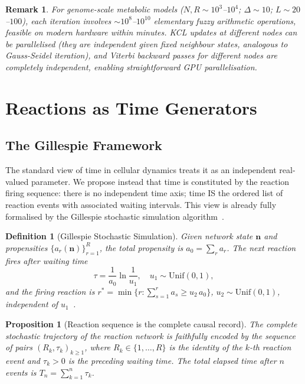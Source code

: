 \documentclass[twocolumn,10pt,a4paper]{article}
\newtheorem{proposition}[theorem]{Proposition}
\newtheorem{definition}[theorem]{Definition}
\newtheorem{remark}[theorem]{Remark}
\begin{document}
\begin{remark}
For genome-scale metabolic models ($N,R\sim 10^3$--$10^4$; $\Delta\sim 10$;
$L\sim 20$--$100$), each iteration involves $\sim 10^8$--$10^{10}$ elementary
fuzzy arithmetic operations, feasible on modern hardware within minutes.  KCL
updates at different nodes can be parallelised (they are independent given
fixed neighbour states, analogous to Gauss-Seidel iteration), and Viterbi
backward passes for different nodes are completely independent, enabling
straightforward GPU parallelisation.
\end{remark}

\section{Reactions as Time Generators}
\label{sec:time}

\subsection{The Gillespie Framework}
\label{sec:time-gillespie}

The standard view of time in cellular dynamics treats it as an independent
real-valued parameter.  We propose instead that time is constituted by the
reaction firing sequence: there is no independent time axis; time IS the
ordered list of reaction events with associated waiting intervals.  This view
is already fully formalised by the Gillespie stochastic simulation
algorithm~\cite{Gillespie1977,Gillespie1976}.

\begin{definition}[Gillespie Stochastic Simulation]
\label{def:gillespie}
Given network state $\mathbf{n}$ and propensities $\{a_r(\mathbf{n})\}_{r=1}^R$,
the total propensity is $a_0=\sum_r a_r$.  The next reaction fires after
waiting time
\begin{equation}
  \tau = \frac{1}{a_0}\ln\frac{1}{u_1},\quad u_1\sim\mathrm{Unif}(0,1),
  \label{eq:gillespie-tau}
\end{equation}
and the firing reaction is
$r^*=\min\!\bigl\{r:\sum_{s=1}^r a_s\geq u_2\,a_0\bigr\}$,
$u_2\sim\mathrm{Unif}(0,1)$, independent of $u_1$~\cite{Gillespie1977}.
\end{definition}

\begin{proposition}[Reaction sequence is the complete causal record]
\label{prop:causal-record}
The complete stochastic trajectory of the reaction network is faithfully encoded
by the sequence of pairs $(R_k,\tau_k)_{k\geq 1}$, where $R_k\in\{1,\ldots,R\}$
is the identity of the $k$-th reaction event and $\tau_k>0$ is the preceding
waiting time.  The total elapsed time after $n$ events is
$T_n=\sum_{k=1}^n\tau_k$.
\end{proposition}
\end{document}
